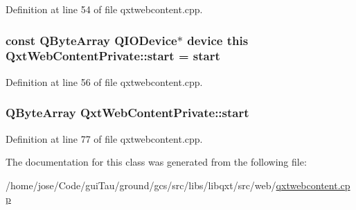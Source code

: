 Definition at line 54 of file qxtwebcontent.\-cpp.

\hypertarget{class_qxt_web_content_private_a2f968f984d86326928630d593d71d94f}{
\subsubsection[{start}]{\setlength{\rightskip}{0pt plus 5cm}const Q\-Byte\-Array Q\-I\-O\-Device$\ast$ {\bf device} this Qxt\-Web\-Content\-Private\-::start = {\bf start}}}\label{class_qxt_web_content_private_a2f968f984d86326928630d593d71d94f}


Definition at line 56 of file qxtwebcontent.\-cpp.

\hypertarget{class_qxt_web_content_private_a608a06e4b9b4e84a5f883098844bf7a7}{
\subsubsection[{start}]{\setlength{\rightskip}{0pt plus 5cm}Q\-Byte\-Array Qxt\-Web\-Content\-Private\-::start}}\label{class_qxt_web_content_private_a608a06e4b9b4e84a5f883098844bf7a7}


Definition at line 77 of file qxtwebcontent.\-cpp.



The documentation for this class was generated from the following file\-:\begin{DoxyCompactItemize}
\item 
/home/jose/\-Code/gui\-Tau/ground/gcs/src/libs/libqxt/src/web/\hyperlink{qxtwebcontent_8cpp}{qxtwebcontent.\-cpp}\end{DoxyCompactItemize}
